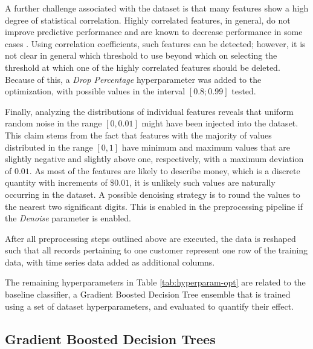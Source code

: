 \documentclass[runningheads]{llncs}
\begin{document}
A further challenge associated with the dataset is that many features show a high degree of statistical correlation. Highly correlated features, in general, do not improve predictive performance and are known to decrease performance in some cases \cite{yoo2014study}. Using correlation coefficients, such features can be detected; however, it is not clear in general which threshold to use beyond which on selecting the threshold at which one of the highly correlated features should be deleted. Because of this, a \emph{Drop Percentage}  hyperparameter was added to the optimization, with possible values in the interval $[0.8; 0.99]$ tested.

Finally, analyzing the distributions of individual features reveals that uniform random noise in the range $[0, 0.01]$ might have been injected into the dataset. This claim stems from the fact that features with the majority of values distributed in the range $[0, 1]$ have minimum and maximum values that are slightly negative and slightly above one, respectively, with a maximum deviation of $0.01$. As most of the features are likely to describe money, which is a discrete quantity with increments of $\$0.01$, it is unlikely such values are naturally occurring in the dataset. A possible denoising strategy is to round the values to the nearest two significant digits. This is enabled in the preprocessing pipeline if the \emph{Denoise} parameter is enabled.

After all preprocessing steps outlined above are executed, the data is reshaped such that all records pertaining to one customer represent one row of the training data, with time series data added as additional columns.


The remaining hyperparameters in Table \ref{tab:hyperparam-opt} are related to the baseline classifier, a Gradient Boosted Decision Tree ensemble that is trained using a set of dataset hyperparameters, and evaluated to quantify their effect. 

\subsection{Gradient Boosted Decision Trees}
\label{sec:gbdt}
\end{document}
